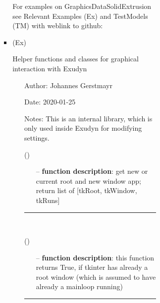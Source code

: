 \begin{itemize}[leftmargin=1.4cm]
\begin{itemize}[leftmargin=1.4cm]
\begin{itemize}[leftmargin=1.4cm]
\begin{itemize}[leftmargin=0.5cm]
\begin{itemize}[leftmargin=1.4cm]
\begin{itemize}[leftmargin=1.4cm]
\begin{itemize}[leftmargin=0.5cm]
\begin{itemize}[leftmargin=1.4cm]
\begin{itemize}[leftmargin=0.5cm]
\begin{itemize}[leftmargin=0.7cm]
\vspace{12pt}\end{itemize}
%
%
\noindent For examples on GraphicsDataSolidExtrusion see Relevant Examples (Ex) and TestModels (TM) with weblink to github:
\bi
 \item \footnotesize {} (Ex)
\ei

%
\label{sec:module:GUI}
  Helper functions and classes for graphical interaction with Exudyn
\begin{itemize}[leftmargin=1.4cm]
\setlength{\itemindent}{-1.4cm}
\item[]Author:    Johannes Gerstmayr
\item[]Date:      2020-01-25
\item[]Notes:     This is an internal library, which is only used inside Exudyn for modifying settings.
\ei
\begin{flushleft}
\label{sec:GUI:GetTkRootAndNewWindow}
()
\end{flushleft}
\setlength{\itemindent}{0.7cm}
\begin{itemize}[leftmargin=0.7cm]
\item[--]
{\bf function description}: get new or current root and new window app; return list of [tkRoot, tkWindow, tkRuns]
\vspace{12pt}\end{itemize}
%
\noindent\rule{8cm}{0.75pt}\vspace{1pt} \\ 
\begin{flushleft}
\label{sec:GUI:TkRootExists}
()
\end{flushleft}
\setlength{\itemindent}{0.7cm}
\begin{itemize}[leftmargin=0.7cm]
\item[--]
{\bf function description}: this function returns True, if tkinter has already a root window (which is assumed to have already a mainloop running)
\vspace{12pt}\end{itemize}
%
\noindent\rule{8cm}{0.75pt}\vspace{1pt} \\ 

\end{itemize}
\end{itemize}
\end{itemize}
\end{itemize}
\end{itemize}
\end{itemize}
\end{itemize}
\end{itemize}
\end{itemize}
\end{itemize}
